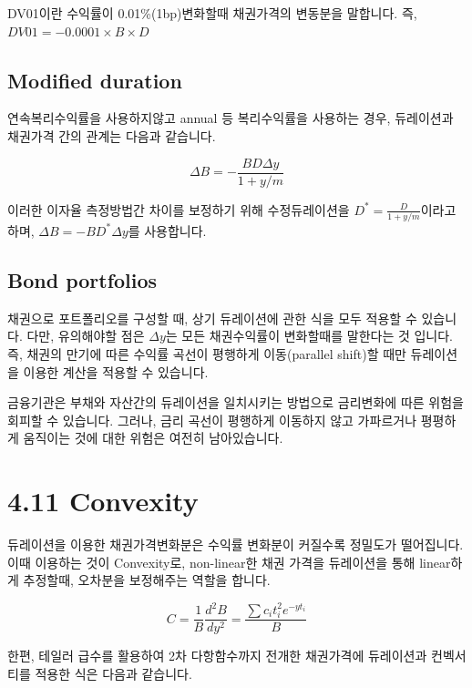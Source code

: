 \documentclass[
  letterpaper,
  DIV=11,
  numbers=noendperiod]{scrreprt}
\begin{document}
DV01이란 수익률이 0.01\%(1bp)변화할때 채권가격의 변동분을 말합니다. 즉,
\(DV01=-0.0001\times B\times D\)

\subsection*{Modified duration}\label{modified-duration}

연속복리수익률을 사용하지않고 annual 등 복리수익률을 사용하는 경우,
듀레이션과 채권가격 간의 관계는 다음과 같습니다.

\[\Delta B=-\frac{BD\Delta y}{1+y/m}\]

이러한 이자율 측정방법간 차이를 보정하기 위해 수정듀레이션을
\(D^*=\frac{D}{1+y/m}\)이라고 하며, \(\Delta B=-BD^*\Delta y\)를
사용합니다.

\subsection*{Bond portfolios}\label{bond-portfolios}

채권으로 포트폴리오를 구성할 때, 상기 듀레이션에 관한 식을 모두 적용할
수 있습니다. 다만, 유의해야할 점은 \(\Delta y\)는 모든 채권수익률이
변화할때를 말한다는 것 입니다. 즉, 채권의 만기에 따른 수익률 곡선이
평행하게 이동(parallel shift)할 때만 듀레이션을 이용한 계산을 적용할 수
있습니다.

금융기관은 부채와 자산간의 듀레이션을 일치시키는 방법으로 금리변화에
따른 위험을 회피할 수 있습니다. 그러나, 금리 곡선이 평행하게 이동하지
않고 가파르거나 평평하게 움직이는 것에 대한 위험은 여전히 남아있습니다.

\section*{4.11 Convexity}\label{convexity}


듀레이션을 이용한 채권가격변화분은 수익률 변화분이 커질수록 정밀도가
떨어집니다. 이때 이용하는 것이 Convexity로, non-linear한 채권 가격을
듀레이션을 통해 linear하게 추정할때, 오차분을 보정해주는 역할을 합니다.

\[C=\frac{1}{B}\frac{d^2B}{dy^2}=\frac{\sum c_it_i^2e^{-yt_i}}{B}\]

한편, 테일러 급수를 활용하여 2차 다항함수까지 전개한 채권가격에
듀레이션과 컨벡서티를 적용한 식은 다음과 같습니다.
\end{document}
